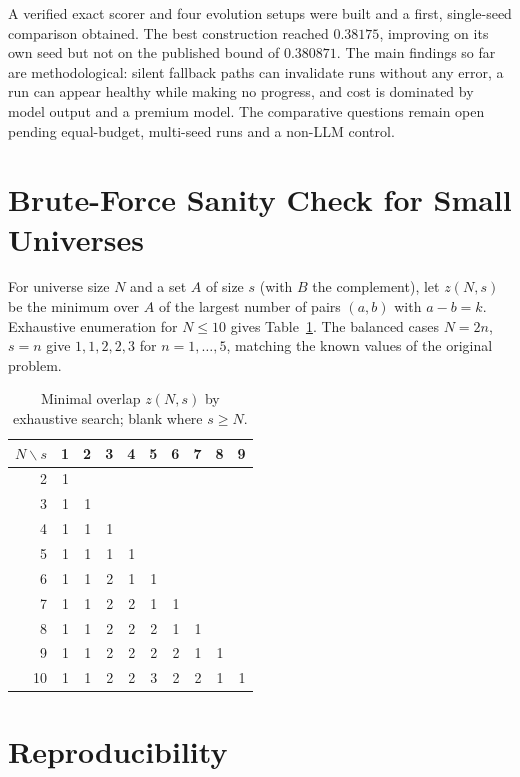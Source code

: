 \documentclass[11pt]{article}
\begin{document}
A verified exact scorer and four evolution setups were built and a first,
single-seed comparison obtained. The best construction reached $0.38175$,
improving on its own seed but not on the published bound of $0.380871$. The
main findings so far are methodological: silent fallback paths can invalidate
runs without any error, a run can appear healthy while making no progress, and
cost is dominated by model output and a premium model. The comparative
questions remain open pending equal-budget, multi-seed runs and a non-LLM
control.

\appendix
\section{Brute-Force Sanity Check for Small Universes}

For universe size $N$ and a set $A$ of size $s$ (with $B$ the complement), let
$z(N,s)$ be the minimum over $A$ of the largest number of pairs $(a,b)$ with
$a-b=k$. Exhaustive enumeration for $N\le10$ gives Table~\ref{tab:small}. The
balanced cases $N=2n$, $s=n$ give $1,1,2,2,3$ for $n=1,\dots,5$, matching the
known values of the original problem.

\begin{table}[h]
\centering
\caption{Minimal overlap $z(N,s)$ by exhaustive search; blank where $s\ge N$.}
\label{tab:small}
\small
\begin{tabular}{r|rrrrrrrrr}
\toprule
$N\backslash s$ & 1 & 2 & 3 & 4 & 5 & 6 & 7 & 8 & 9 \\
\midrule
2 & 1 & & & & & & & & \\
3 & 1 & 1 & & & & & & & \\
4 & 1 & 1 & 1 & & & & & & \\
5 & 1 & 1 & 1 & 1 & & & & & \\
6 & 1 & 1 & 2 & 1 & 1 & & & & \\
7 & 1 & 1 & 2 & 2 & 1 & 1 & & & \\
8 & 1 & 1 & 2 & 2 & 2 & 1 & 1 & & \\
9 & 1 & 1 & 2 & 2 & 2 & 2 & 1 & 1 & \\
10 & 1 & 1 & 2 & 2 & 3 & 2 & 2 & 1 & 1 \\
\bottomrule
\end{tabular}
\end{table}

\section{Reproducibility}
\end{document}
